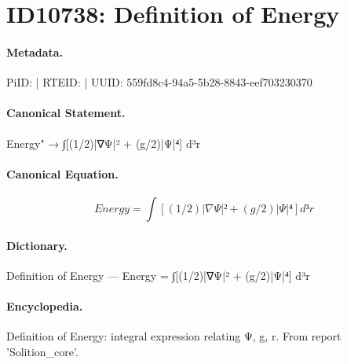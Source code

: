 \section*{ID10738: Definition of Energy}
\paragraph{Metadata.}
PiID:  | RTEID:  | UUID: 559fd8c4-94a5-5b28-8843-eef703230370

\paragraph{Canonical Statement.}
Energy" → ∫[(1/2)|∇Ψ|² + (g/2)|Ψ|⁴] d³r

\paragraph{Canonical Equation.}
\[
Energy = ∫[(1/2)|∇Ψ|² + (g/2)|Ψ|⁴] d³r
\]

\paragraph{Dictionary.}
Definition of Energy — Energy = ∫[(1/2)|∇Ψ|² + (g/2)|Ψ|⁴] d³r

\paragraph{Encyclopedia.}
Definition of Energy: integral expression relating Ψ, g, r. From report 'Solition\_core'.
